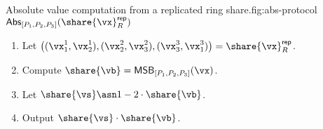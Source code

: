\begin{Boxfig}{Absolute value computation from a replicated ring share.}{fig:abs-protocol}
  {$\mathsf{Abs}_{[P_1, P_2, P_3]}(\share{\vx}_R^{\mathsf{rep}})$}
  \begin{enumerate}
    \item Let $\left( (\vx_1^1, \vx_2^1), (\vx_2^2, \vx_3^2), (\vx_3^3, \vx_1^3) \right) = \share{\vx}^{\mathsf{rep}}_{R}$.
    \item Compute $\share{\vb} = \mathsf{MSB}_{[P_1, P_2, P_3]}(\vx)$.
    \item Let $\share{\vs} \asn 1 - 2 \cdot \share{\vb}$.
    \item Output $\share{\vs} \cdot \share{\vb}$.
  \end{enumerate}

\end{Boxfig}


